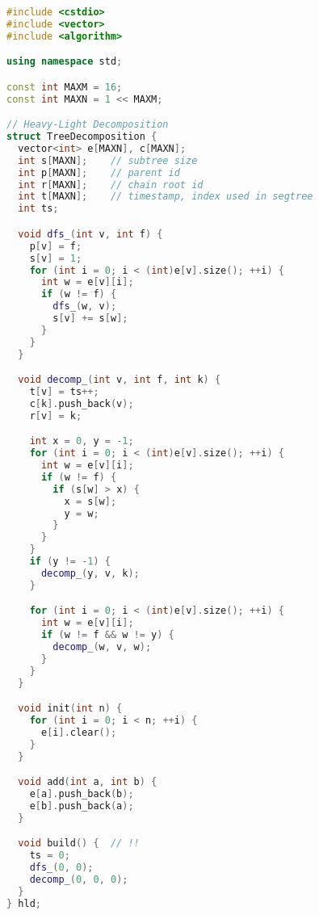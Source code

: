 \begin{lstlisting}[language=C++]
#include <cstdio>
#include <vector>
#include <algorithm>

using namespace std;

const int MAXM = 16;
const int MAXN = 1 << MAXM;

// Heavy-Light Decomposition
struct TreeDecomposition {
  vector<int> e[MAXN], c[MAXN];
  int s[MAXN];    // subtree size
  int p[MAXN];    // parent id
  int r[MAXN];    // chain root id
  int t[MAXN];    // timestamp, index used in segtree
  int ts;

  void dfs_(int v, int f) {
    p[v] = f;
    s[v] = 1;
    for (int i = 0; i < (int)e[v].size(); ++i) {
      int w = e[v][i];
      if (w != f) {
        dfs_(w, v);
        s[v] += s[w];
      }
    }
  }

  void decomp_(int v, int f, int k) {
    t[v] = ts++;
    c[k].push_back(v);
    r[v] = k;

    int x = 0, y = -1;
    for (int i = 0; i < (int)e[v].size(); ++i) {
      int w = e[v][i];
      if (w != f) {
        if (s[w] > x) {
          x = s[w];
          y = w;
        }
      }
    }
    if (y != -1) {
      decomp_(y, v, k);
    }

    for (int i = 0; i < (int)e[v].size(); ++i) {
      int w = e[v][i];
      if (w != f && w != y) {
        decomp_(w, v, w);
      }
    }
  }

  void init(int n) {
    for (int i = 0; i < n; ++i) {
      e[i].clear();
    }
  }

  void add(int a, int b) {
    e[a].push_back(b);
    e[b].push_back(a);
  }

  void build() {  // !!
    ts = 0;
    dfs_(0, 0);
    decomp_(0, 0, 0);
  }
} hld;


\end{lstlisting}
